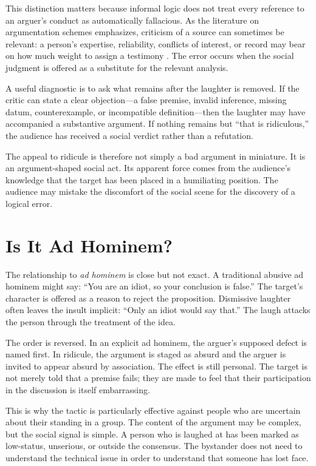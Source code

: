 ﻿\documentclass[12pt,a4paper]{book}
\begin{document}
This distinction matters because informal logic does not treat every reference to an arguer's conduct as automatically fallacious. As the literature on argumentation schemes emphasizes, criticism of a source can sometimes be relevant: a person's expertise, reliability, conflicts of interest, or record may bear on how much weight to assign a testimony \cite{walton1998}. The error occurs when the social judgment is offered as a substitute for the relevant analysis.

A useful diagnostic is to ask what remains after the laughter is removed. If the critic can state a clear objection---a false premise, invalid inference, missing datum, counterexample, or incompatible definition---then the laughter may have accompanied a substantive argument. If nothing remains but ``that is ridiculous,'' the audience has received a social verdict rather than a refutation.

The appeal to ridicule is therefore not simply a bad argument in miniature. It is an argument-shaped social act. Its apparent force comes from the audience's knowledge that the target has been placed in a humiliating position. The audience may mistake the discomfort of the social scene for the discovery of a logical error.

\section{Is It Ad Hominem?}

The relationship to \emph{ad hominem} is close but not exact. A traditional abusive ad hominem might say: ``You are an idiot, so your conclusion is false.'' The target's character is offered as a reason to reject the proposition. Dismissive laughter often leaves the insult implicit: ``Only an idiot would say that.'' The laugh attacks the person through the treatment of the idea.

The order is reversed. In an explicit ad hominem, the arguer's supposed defect is named first. In ridicule, the argument is staged as absurd and the arguer is invited to appear absurd by association. The effect is still personal. The target is not merely told that a premise fails; they are made to feel that their participation in the discussion is itself embarrassing.

This is why the tactic is particularly effective against people who are uncertain about their standing in a group. The content of the argument may be complex, but the social signal is simple. A person who is laughed at has been marked as low-status, unserious, or outside the consensus. The bystander does not need to understand the technical issue in order to understand that someone has lost face.
\end{document}
